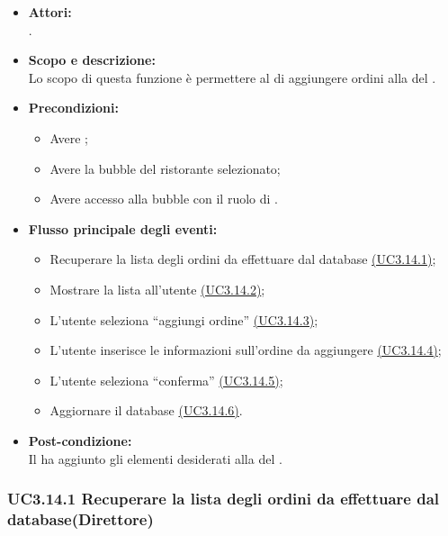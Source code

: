 \begin{itemize}
	\item \textbf{Attori:}
	\\.
	\item \textbf{Scopo e descrizione:} 
	\\Lo scopo di questa funzione è permettere al  di aggiungere ordini alla  del .
	\item \textbf{Precondizioni:}
	\begin{itemize}
		\item Avere ;
		\item Avere la bubble del ristorante selezionato;
		\item Avere accesso alla bubble con il ruolo di .
	\end{itemize}
	\item \textbf{Flusso principale degli eventi:}
	\begin{itemize}
		\item Recuperare la lista degli ordini da effettuare dal database \hyperref[UC3.14.1]{(UC3.14.1)};
		\item Mostrare la lista all’utente \hyperref[UC3.14.2]{(UC3.14.2)};
		\item L’utente  seleziona “aggiungi ordine” \hyperref[UC3.14.3]{(UC3.14.3)};
		\item L’utente  inserisce le informazioni sull’ordine da aggiungere \hyperref[UC3.14.4]{(UC3.14.4)};
		\item L’utente  seleziona “conferma” \hyperref[UC3.14.5]{(UC3.14.5)};
		\item Aggiornare il database \hyperref[UC3.14.6]{(UC3.14.6)}.
	\end{itemize}
	\item \textbf{Post-condizione:}
	\\Il {} ha aggiunto gli elementi desiderati alla  del .
\end{itemize}

\subsubsection{UC3.14.1 Recuperare la lista degli ordini da effettuare dal database(Direttore)} \label{UC3.14.1}

